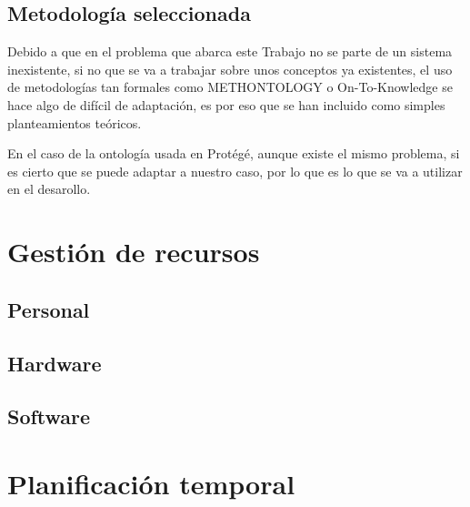 \subsection{Metodología seleccionada}

Debido a que en el problema que abarca este Trabajo no se parte de un sistema inexistente, si no que se va a trabajar sobre unos conceptos ya existentes, el uso de metodologías tan formales como METHONTOLOGY o On-To-Knowledge se hace algo de difícil de adaptación, es por eso que se han incluido como simples planteamientos teóricos.

\bigskip
En el caso de la ontología usada en Protégé, aunque existe el mismo problema, si es cierto que se puede adaptar a nuestro caso, por lo que es lo que se va a utilizar en el desarollo.

\section{Gestión de recursos}

\subsection{Personal}

\subsection{Hardware}

\subsection{Software}

\section{Planificación temporal}